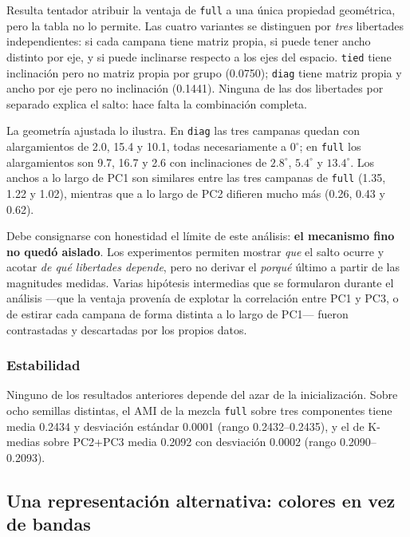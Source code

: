 \documentclass[10pt,journal]{IEEEtran}
\begin{document}
  Resulta tentador atribuir la ventaja de \texttt{full} a una \'unica propiedad geom\'etrica, pero la tabla no lo permite. Las cuatro variantes se distinguen por \emph{tres} libertades independientes: si cada campana tiene matriz propia, si puede tener ancho distinto por eje, y si puede inclinarse respecto a los ejes del espacio. \texttt{tied} tiene inclinaci\'on pero no matriz propia por grupo (0.0750); \texttt{diag} tiene matriz propia y ancho por eje pero no inclinaci\'on (0.1441). Ninguna de las dos libertades por separado explica el salto: hace falta la combinaci\'on completa.

  La geometr\'ia ajustada lo ilustra. En \texttt{diag} las tres campanas quedan con alargamientos de 2.0, 15.4 y 10.1, todas necesariamente a $0^{\circ}$; en \texttt{full} los alargamientos son 9.7, 16.7 y 2.6 con inclinaciones de $2.8^{\circ}$, $5.4^{\circ}$ y $13.4^{\circ}$. Los anchos a lo largo de PC1 son similares entre las tres campanas de \texttt{full} (1.35, 1.22 y 1.02), mientras que a lo largo de PC2 difieren mucho m\'as (0.26, 0.43 y 0.62).

  Debe consignarse con honestidad el l\'imite de este an\'alisis: \textbf{el mecanismo fino no qued\'o aislado}. Los experimentos permiten mostrar \emph{que} el salto ocurre y acotar \emph{de qu\'e libertades depende}, pero no derivar el \emph{porqu\'e} \'ultimo a partir de las magnitudes medidas. Varias hip\'otesis intermedias que se formularon durante el an\'alisis ---que la ventaja proven\'ia de explotar la correlaci\'on entre PC1 y PC3, o de estirar cada campana de forma distinta a lo largo de PC1--- fueron contrastadas y descartadas por los propios datos.

  \subsubsection{Estabilidad}

  Ninguno de los resultados anteriores depende del azar de la inicializaci\'on. Sobre ocho semillas distintas, el AMI de la mezcla \texttt{full} sobre tres componentes tiene media 0.2434 y desviaci\'on est\'andar 0.0001 (rango 0.2432--0.2435), y el de K-medias sobre PC2+PC3 media 0.2092 con desviaci\'on 0.0002 (rango 0.2090--0.2093).

  \subsection{Una representaci\'on alternativa: colores en vez de bandas}
\end{document}
